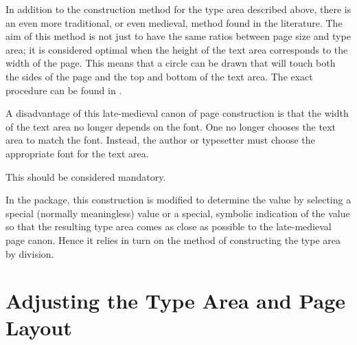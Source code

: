 \begin{Explain}
  In addition to the construction method for the type area
  described above, there is an even more traditional, or even medieval, method
  found in the literature. The aim of this method is not just to have the same 
  ratios between page size and type area; it is considered optimal when the 
  height of the text area corresponds to the width of the page. This means 
  that a circle can be drawn that will touch both the sides of the page and 
  the top and bottom of the text area. The exact procedure can be found in 
  \cite{JTsch87}.

  A disadvantage of this late-medieval canon of page construction is that the
  width of the text area no longer depends on the font. One no longer chooses
  the text area to match the font. Instead, the author or typesetter must 
  choose the appropriate font for the text area.
%
\iftrue
 This should be considered mandatory.
\fi

  In the  package, this construction is modified to
  determine the  value by selecting a special (normally meaningless)
   value or a special, symbolic indication of the  value so
  that the resulting type area comes as close as possible to the late-medieval
  page canon. Hence it relies in turn on the method of constructing the type
  area by division.
%
\iffalse
  If you choose a good font, the result often coincides with the search for
  the optimal \Var{DIV} value. See also \autoref{sec:typearea.options},
  \DescPageRef{typearea.option.DIV.calc}.
%
\fi
\end{Explain}



\section{Adjusting the Type Area and Page Layout}

